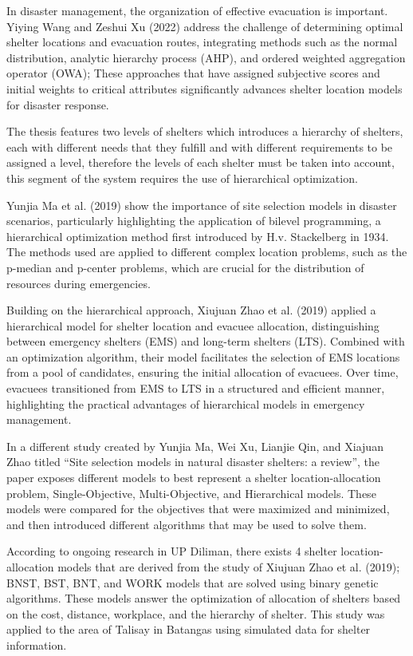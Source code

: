 In disaster management, the organization of effective evacuation is important. Yiying Wang and Zeshui Xu (2022) address the challenge of determining optimal shelter locations and evacuation routes, integrating methods such as the normal distribution, analytic hierarchy process (AHP), and ordered weighted aggregation operator (OWA); These approaches that have assigned subjective scores and initial weights to critical attributes significantly advances shelter location models for disaster response. \parencite{Yiying2022}

The thesis features two levels of shelters which introduces a hierarchy of shelters, each with different needs that they fulfill and with different requirements to be assigned a level, therefore the levels of each shelter must be taken into account, this segment of the system requires the use of hierarchical optimization.

Yunjia Ma et al. (2019) show the importance of site selection models in disaster scenarios, particularly highlighting the application of bilevel programming, a hierarchical optimization method first introduced by H.v. Stackelberg in 1934. The methods used are applied to different complex location problems, such as the p-median and p-center problems, which are crucial for the distribution of resources during emergencies. \parencite{Yunjia2019}

Building on the hierarchical approach, Xiujuan Zhao et al. (2019) applied a hierarchical model for shelter location and evacuee allocation, distinguishing between emergency shelters (EMS) and long-term shelters (LTS). Combined with an optimization algorithm, their model facilitates the selection of EMS locations from a pool of candidates, ensuring the initial allocation of evacuees. Over time, evacuees transitioned from EMS to LTS in a structured and efficient manner, highlighting the practical advantages of hierarchical models in emergency management. \parencite{Xiujuan2019}

In a different study created by Yunjia Ma, Wei Xu, Lianjie Qin, and Xiajuan Zhao titled “Site selection models in natural disaster shelters: a review”, the paper exposes different models to best represent a shelter location-allocation problem, Single-Objective, Multi-Objective, and Hierarchical models. These models were compared for the objectives that were maximized and minimized, and then introduced different algorithms that may be used to solve them. \parencite{Yunjia2019}

According to ongoing research in UP Diliman, there exists 4 shelter location-allocation models that are derived from the study of Xiujuan Zhao et al. (2019); BNST, BST, BNT, and WORK models that are solved using binary genetic algorithms. These models answer the optimization of allocation of shelters based on the cost, distance, workplace, and the hierarchy of shelter. This study was applied to the area of Talisay in Batangas using simulated data for shelter information. \parencite{Xiujuan2019}

